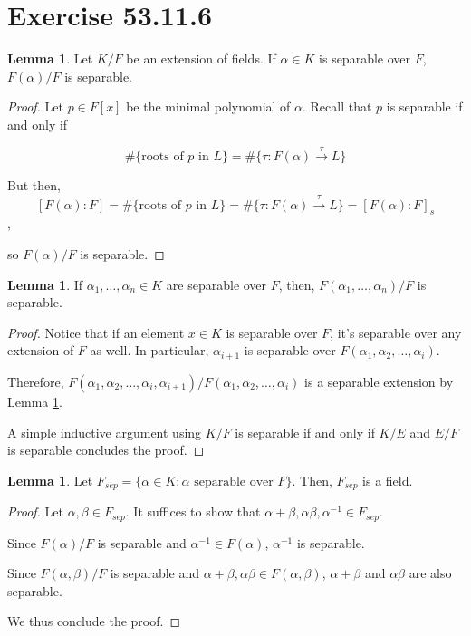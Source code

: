 \documentclass{article}
\theoremstyle{definition}
\newtheorem{lemma}[theorem]{Lemma}
\begin{document}
\section{Exercise 53.11.6}

\begin{lemma}\label{adjoining_separable_elements_produce_separable_extensions}
    Let $K/F$ be an extension of fields. If $\alpha \in K$ is separable over $F$,
    $F(\alpha)/F$ is separable.
\end{lemma}
\begin{proof}
    Let $p \in F[x]$ be the minimal polynomial of $\alpha$. Recall that $p$ is separable if and only if

    \[ \#\{\text{roots of $p$ in $L$\}} = \# \{\tau: F(\alpha) \xrightarrow{\tau} L\}\] 

    But then, \[ [F(\alpha): F] = \#\{\text{roots of $p$ in $L$\}} = \# \{\tau: F(\alpha) \xrightarrow{\tau} L\} = [F(\alpha) : F]_{s}\],
    
    so $F(\alpha)/F$ is separable.
\end{proof}

\begin{lemma}
    If $\alpha_{1}, \ldots, \alpha_{n} \in K$ are separable over $F$, then, $F(\alpha_{1}, \ldots, \alpha_{n})/F$
    is separable.
\end{lemma}
\begin{proof}
    Notice that if an element $x \in K$ is separable over $F$, it's separable over any extension
    of $F$ as well. In particular, $\alpha_{i+1}$ is separable over $F(\alpha_{1},\alpha_{2},\ldots,\alpha_{i})$.
    
    Therefore, $F(\alpha_{1},\alpha_{2},\ldots,\alpha_{i},\alpha_{i+1})/F(\alpha_{1},\alpha_{2},\ldots,\alpha_{i})$
    is a separable extension by Lemma \ref{adjoining_separable_elements_produce_separable_extensions}.

    A simple inductive argument using $K/F$ is separable if and only if $K/E$ and $E/F$ is separable concludes the proof.
\end{proof}

\begin{lemma}\label{separable_part_of_an_extension_is_a_field}
    Let $F_{sep} = \{ \alpha \in K: \alpha \text{ separable over $F$} \}$. Then, $F_{sep}$ is a field.
\end{lemma}
\begin{proof}
    Let $\alpha, \beta \in F_{sep}$. It suffices to show that $\alpha + \beta, \alpha \beta, \alpha^{-1} \in F_{sep}$.

    Since $F(\alpha)/F$ is separable and $\alpha^{-1} \in F(\alpha)$, $\alpha^{-1}$ is separable.

    Since $F(\alpha, \beta)/F$ is separable and $\alpha + \beta, \alpha \beta \in F(\alpha, \beta)$, 
    $\alpha + \beta$ and $ \alpha \beta $ are also separable.

    We thus conclude the proof.
\end{proof}
\end{document}

